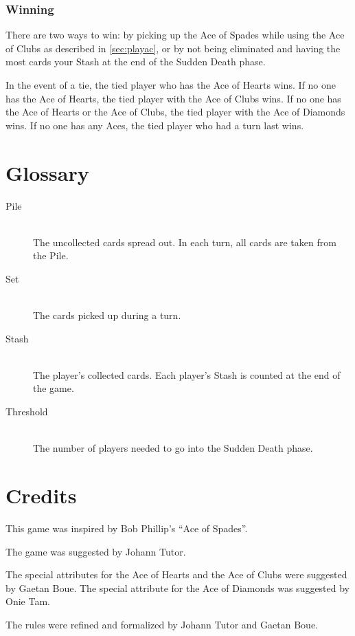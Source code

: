 \documentclass{article}
\begin{document}
\subsubsection{Winning}

There are two ways to win: by picking up the Ace of Spades while using
the Ace of Clubs as described in \ref{sec:playac}, or by not being
eliminated and having the most cards your Stash at the end of the Sudden
Death phase.

In the event of a tie, the tied player who has the Ace of Hearts wins.
If no one has the Ace of Hearts, the tied player with the Ace of Clubs
wins. If no one has the Ace of Hearts or the Ace of Clubs, the tied
player with the Ace of Diamonds wins. If no one has any Aces, the tied
player who had a turn last wins.

\section{Glossary}
\begin{description}
  \item[Pile]\hfill\\
    The uncollected cards spread out. In each turn, all cards are taken
    from the Pile.
  \item[Set]\hfill\\
    The cards picked up during a turn.
  \item[Stash]\hfill\\
    The player's collected cards. Each player's Stash is
    counted at the end of the game.
  \item[Threshold]\hfill\\
    The number of players needed to go into the Sudden
    Death phase.
\end{description}

\section{Credits}

This game was inspired by Bob Phillip's ``Ace of Spades''.

The game was suggested by Johann Tutor.

The special attributes for the Ace of Hearts and the Ace of Clubs were
suggested by Gaetan Boue. The special attribute for the Ace of Diamonds
was suggested by Onie Tam.

The rules were refined and formalized by Johann Tutor and Gaetan Boue.
\end{document}
